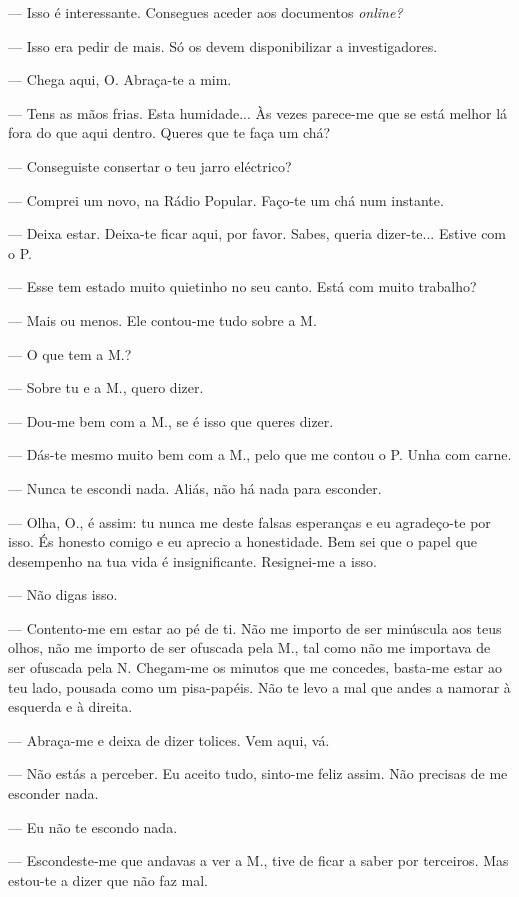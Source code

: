 --- Isso é interessante. Consegues aceder aos documentos
\emph{online?}

--- Isso era pedir de mais. Só os devem disponibilizar a investigadores.

--- Chega aqui, O. Abraça-te a mim.

--- Tens as mãos frias. Esta humidade... Às vezes parece-me que se está
melhor lá fora do que aqui dentro. Queres que te faça um
chá?

--- Conseguiste consertar o teu jarro eléctrico?

--- Comprei um novo, na Rádio Popular. Faço-te um chá num instante.

--- Deixa estar. Deixa-te ficar aqui, por favor. Sabes, queria
  dizer-te... Estive com o P.

--- Esse tem estado muito quietinho no seu canto. Está com muito trabalho?

--- Mais ou menos. Ele contou-me tudo sobre a M.

--- O que tem a M.?

--- Sobre tu e a M., quero dizer.

--- Dou-me bem com a M., se é isso que queres dizer.

--- Dás-te mesmo muito bem com a M., pelo que me contou o P. Unha com
  carne.

--- Nunca te escondi nada. Aliás, não há nada para esconder.

--- Olha, O., é assim: tu nunca me deste falsas esperanças e eu
  agradeço-te por isso. És honesto comigo e eu aprecio a honestidade.
  Bem sei que o papel que desempenho na tua vida é insignificante.
  Resignei-me a isso.

--- Não digas isso.

--- Contento-me em estar ao pé de ti. Não me importo de
ser minúscula aos teus olhos, não me importo de ser ofuscada pela M.,
tal como não me importava de ser ofuscada pela N. Chegam-me os minutos
que me concedes, basta-me estar ao teu lado, pousada como um
pisa-papéis. Não te levo a mal que andes a namorar à esquerda e à
direita.

--- Abraça-me e deixa de dizer tolices. Vem aqui, vá.

--- Não estás a perceber. Eu aceito tudo, sinto-me feliz assim. Não
  precisas de me esconder nada.

--- Eu não te escondo nada.

--- Escondeste-me que andavas a ver a M., tive de ficar a saber por
  terceiros. Mas estou-te a dizer que não faz mal.

